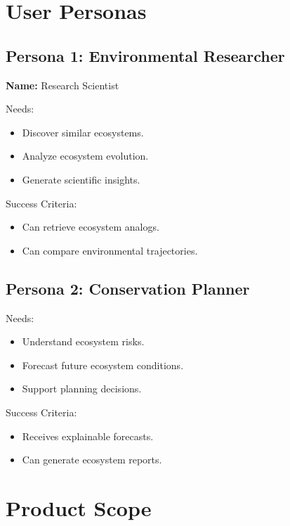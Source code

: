 \documentclass[11pt,a4paper]{article}
\begin{document}
\section{User Personas}

\subsection{Persona 1: Environmental Researcher}

\textbf{Name:} Research Scientist

Needs:

\begin{itemize}
\item Discover similar ecosystems.
\item Analyze ecosystem evolution.
\item Generate scientific insights.
\end{itemize}

Success Criteria:

\begin{itemize}
\item Can retrieve ecosystem analogs.
\item Can compare environmental trajectories.
\end{itemize}

\subsection{Persona 2: Conservation Planner}

Needs:

\begin{itemize}
\item Understand ecosystem risks.
\item Forecast future ecosystem conditions.
\item Support planning decisions.
\end{itemize}

Success Criteria:

\begin{itemize}
\item Receives explainable forecasts.
\item Can generate ecosystem reports.
\end{itemize}

\section{Product Scope}
\end{document}
